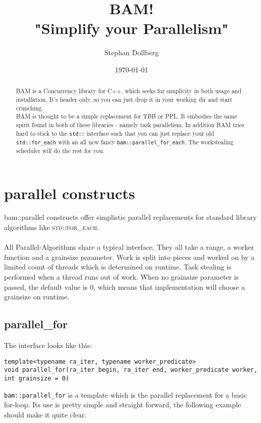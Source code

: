 \documentclass[11pt, a4paper]{article}
\begin{document}
\title{\bf\color{DarkOrchid}BAM!\\
\bf"Simplify your Parallelism"
 }
\author{Stephan Dollberg}
\date{\today}
\maketitle

\begin{abstract}
BAM is a Concurrency library for C++, which seeks for simplicity in both usage and installation. It's header only, so you can just drop it in your working dir and start crunching.\\
BAM is thought to be a simple replacement for TBB or PPL. It embodies the same spirit found in both of these libraries - namely task parallelism. In addition BAM tries hard to stick to the \texttt{std::} interface such that you can just replace your old \texttt{std::for\_each} with an all new fancy \texttt{bam::parallel\_for\_each}. The workstealing scheduler will do the rest for you. 
\end{abstract}

\tableofcontents

\section{parallel constructs}
bam::parallel constructs offer simplistic parallel replacements for standard library algorithms like \textsc{std::for\_each}.
\\\\All Parallel-Algorithms share a typical interface. They all take a range, a worker function and a grainsize parameter. 
Work is split into pieces and worked on by a limited count of threads which is determined on runtime. Task stealing is performed when a thread runs out of work. When no grainsize parameter is passed, the default value is 0, which means that implementation will choose a grainsize on runtime.

\subsection{parallel\_for}

The interface looks like this:

\begin{lstlisting} 
template<typename ra_iter, typename worker_predicate>
void parallel_for(ra_iter begin, ra_iter end, worker_predicate worker, int grainsize = 0)
\end{lstlisting}
\texttt{bam::parallel\_for} is a template which is the parallel replacement for a basic for-loop. Its use is pretty simple and straight forward, the following example should make it quite clear.
\end{document}
